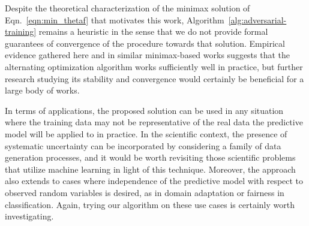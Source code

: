 \documentclass{article}
\theoremstyle{plain}
\begin{document}
Despite the theoretical characterization of the minimax solution of Eqn.~\ref{eqn:min_thetaf}
that motivates this work,
Algorithm~\ref{alg:adversarial-training} remains a heuristic in the sense
that we do not provide formal guarantees of convergence of the procedure towards
that solution. Empirical evidence gathered here and in similar minimax-based
 works suggests
that the alternating optimization algorithm works sufficiently well in practice,
but further research studying its stability and convergence would certainly
be beneficial for a large body of works.

In terms of applications, the proposed solution can be used in any situation
where the training data may not be representative of the real data the
predictive model will be applied to in practice. In the scientific context, the
presence of systematic uncertainty can be incorporated by considering a family
of data generation processes, and it would be worth revisiting those scientific problems
that utilize machine learning in light of this technique. Moreover, the approach
also extends to cases where independence of the predictive model with respect to
observed random variables is desired, as in domain adaptation or fairness in
classification. Again, trying our algorithm on these use cases is certainly
worth investigating.



%





\end{document}
